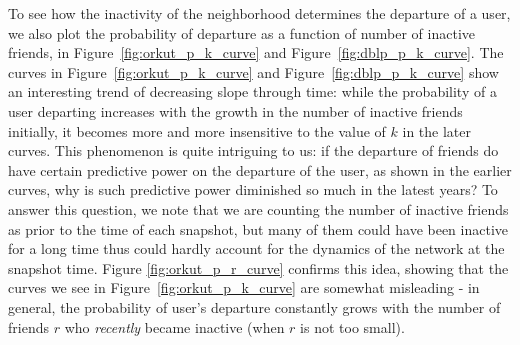 \documentclass[phd,tocprelim]{cornell}
\begin{document}
To see how the inactivity of the neighborhood determines the departure of a user, we also plot the probability of departure as a function of number of inactive friends, in Figure~\ref{fig:orkut_p_k_curve} and Figure~\ref{fig:dblp_p_k_curve}. The curves in Figure~\ref{fig:orkut_p_k_curve} and Figure~\ref{fig:dblp_p_k_curve} show an interesting trend of decreasing slope through time: while the probability of a user departing increases with the growth in the number of inactive friends initially, it becomes more and more insensitive to the value of $k$ in the later curves. This phenomenon is quite intriguing to us: if the departure of friends do have certain predictive power on the departure of the user, as shown in the earlier curves, why is such predictive power diminished so much in the latest years? To answer this question, we note that we are counting the number of inactive friends as prior to the time of each snapshot, but many of them could have been inactive for a long time thus could hardly account for the dynamics of the network at the snapshot time. Figure \ref{fig:orkut_p_r_curve} confirms this idea, showing that the curves we see in Figure~\ref{fig:orkut_p_k_curve} are somewhat misleading -  in general, the probability of user's departure constantly grows with the number of friends $r$ who \emph{recently} became inactive (when $r$ is not too small). 
 

\end{document}
